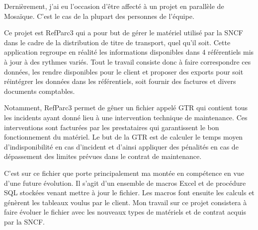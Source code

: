 Dernièrement, j'ai eu l'occasion d'être affecté à un projet en parallèle de Mosaïque. C'est le cas de la plupart des personnes de l'équipe.

Ce projet est RefParc3 qui a pour but de gérer le matériel utilisé par la SNCF dans le cadre de la distribution de titre de transport, quel qu'il soit. Cette application regroupe en réalité les informations disponibles dans 4 référentiels mis à jour à des rythmes variés. Tout le travail consiste donc à faire correspondre ces données, les rendre disponibles pour le client et proposer des exports pour soit réintégrer les données dans les référentiels, soit fournir des factures et divers documents comptables.

Notamment, RefParc3 permet de gêner un fichier appelé GTR qui contient tous les incidents ayant donné lieu à une intervention technique de maintenance. Ces interventions sont facturées par les prestataires qui garantissent le bon fonctionnement du matériel. Le but de la GTR est de calculer le temps moyen d'indisponibilité en cas d'incident et d'ainsi appliquer des pénalités en cas de dépassement des limites prévues dans le contrat de maintenance.

C’est sur ce fichier que porte principalement ma montée en compétence en vue d'une future évolution. Il s'agit d'un ensemble de macros Excel et de procédure SQL stockées venant mettre à jour le fichier. Les macros font ensuite les calculs et génèrent les tableaux voulus par le client. Mon travail sur ce projet consistera à faire évoluer le fichier avec les nouveaux types de matériels et de contrat acquis par la SNCF.
